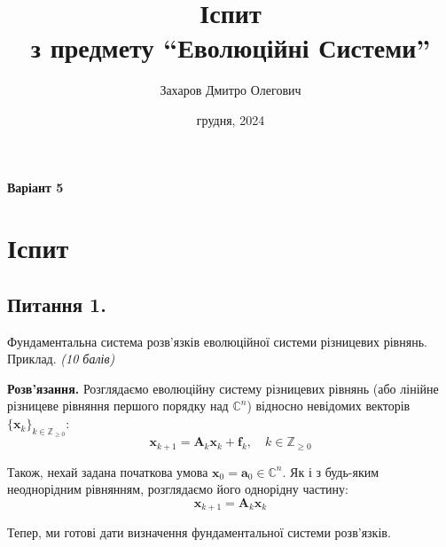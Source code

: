 \documentclass{hw_template}
\title{\huge\bfseries Іспит \\з предмету ``Еволюційні Системи''}
\author{\Large Захаров Дмитро Олегович}
\date{\sffamily 6 грудня, 2024}
\begin{document}
\pagestyle{fancy}

\maketitle

\begin{center}
    \textbf{Варіант 5}
\end{center}

\tableofcontents

\pagebreak

\section{Іспит}

\subsection{Питання 1.}
\begin{problems}
    Фундаментальна система розв’язків еволюційної системи різницевих рівнянь.
Приклад. \textit{(10 балів)}
\end{problems}

\textbf{Розв'язання.} Розглядаємо еволюційну систему різницевих рівнянь (або 
лінійне різницеве рівняння першого порядку над $\mathbb{C}^n$) відносно 
невідомих векторів $\{\mathbf{x}_k\}_{k \in \mathbb{Z}_{\geq 0}}$:
\begin{equation*}
    \mathbf{x}_{k+1} = \boldsymbol{A}_k\mathbf{x}_k + \boldsymbol{f}_k, \quad k \in \mathbb{Z}_{\geq 0}
\end{equation*}

Також, нехай задана початкова умова $\mathbf{x}_0 = \mathbf{a}_0 \in \mathbb{C}^n$. Як і 
з будь-яким неоднорідним рівнянням, розглядаємо його однорідну частину:
\begin{equation*}
    \mathbf{x}_{k+1} = \boldsymbol{A}_k\mathbf{x}_k
\end{equation*}

Тепер, ми готові дати визначення фундаментальної системи розв'язків.
\end{document}
